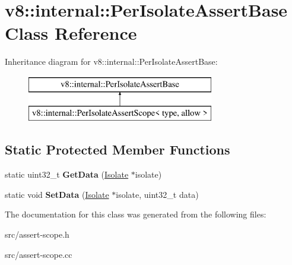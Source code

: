 \hypertarget{classv8_1_1internal_1_1_per_isolate_assert_base}{}\section{v8\+:\+:internal\+:\+:Per\+Isolate\+Assert\+Base Class Reference}
\label{classv8_1_1internal_1_1_per_isolate_assert_base}
Inheritance diagram for v8\+:\+:internal\+:\+:Per\+Isolate\+Assert\+Base\+:\begin{figure}[H]
\begin{center}
\leavevmode
\includegraphics[height=2.000000cm]{classv8_1_1internal_1_1_per_isolate_assert_base}
\end{center}
\end{figure}
\subsection*{Static Protected Member Functions}
\begin{DoxyCompactItemize}
\item 
\hypertarget{classv8_1_1internal_1_1_per_isolate_assert_base_a93bb1b7700d0a9f5380127eca84a0642}{}static uint32\+\_\+t {\bfseries Get\+Data} (\hyperlink{classv8_1_1internal_1_1_isolate}{Isolate} $\ast$isolate)\label{classv8_1_1internal_1_1_per_isolate_assert_base_a93bb1b7700d0a9f5380127eca84a0642}

\item 
\hypertarget{classv8_1_1internal_1_1_per_isolate_assert_base_a95be080486d3d0e337dc1fc9ce35c1cf}{}static void {\bfseries Set\+Data} (\hyperlink{classv8_1_1internal_1_1_isolate}{Isolate} $\ast$isolate, uint32\+\_\+t data)\label{classv8_1_1internal_1_1_per_isolate_assert_base_a95be080486d3d0e337dc1fc9ce35c1cf}

\end{DoxyCompactItemize}


The documentation for this class was generated from the following files\+:\begin{DoxyCompactItemize}
\item 
src/assert-\/scope.\+h\item 
src/assert-\/scope.\+cc\end{DoxyCompactItemize}
